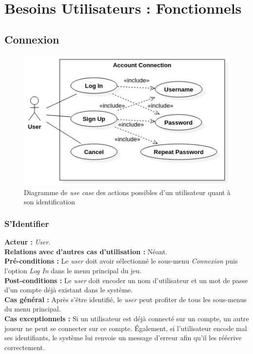 \documentclass[10pt, a4paper]{article}
\begin{document}

\section{Besoins Utilisateurs : Fonctionnels}


\subsection{Connexion}

\begin{figure}[H]
\centering
\includegraphics[scale=0.5]{ConnectionUseCase.png}
\caption{Diagramme de \textit{use case} des actions possibles d'un utilisateur quant à son identification}
\label{UC_co} %
\end{figure}

\subsubsection{S'Identifier}
\textbf{Acteur :} \textit{User}.\\
\textbf{Relations avec d'autres cas d'utilisation :} Néant.\\
\textbf{Pré-conditions :} Le \textit{user} doit avoir sélectionné le sous-menu \textit{Connexion} puis l'option {\itshape Log In} dans le menu principal du jeu.\\
\textbf{Post-conditions :} Le \textit{user} doit encoder un nom d'utilisateur et un mot de passe d'un compte déjà existant dans le système. \\
\textbf{Cas général :} Après s'être identifié, le \textit{user} peut profiter de tous les sous-menus du menu principal.\\
\textbf{Cas exceptionnels :} Si un utilisateur est déjà connecté sur un compte, un autre joueur ne peut se connecter sur ce compte. Également, si l'utilisateur encode mal ses identifiants, le système lui renvoie un message d'erreur afin qu'il les réécrive correctement.
\end{document}
